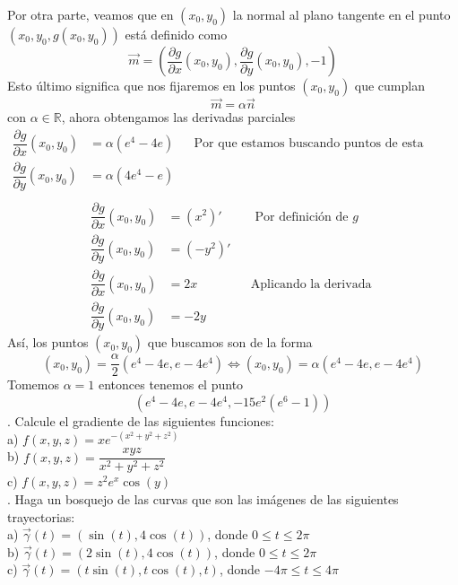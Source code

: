 \documentclass[letterpaper]{article}
\renewcommand{\d}{\partial}
\newcommand{\R}{\mathds{R}}
\renewcommand{\*}{\cdot}
\theoremstyle{definition}
\begin{document}
Por otra parte, veamos que en $ (x_0,y_0) $ la normal al plano tangente en el punto $ (x_0,y_0,g(x_0,y_0)) $ está definido como 
\[ \vec{m} = \left( \dfrac{\d g}{\d x}(x_0, y_0), \dfrac{\d g}{\d y}(x_0,y_0),-1 \right) \]
Esto último significa que nos fijaremos en los puntos $ (x_0,y_0) $ que cumplan \[ \vec{m} = \alpha\vec{n} \] con $ \alpha \in \R $, ahora obtengamos las derivadas parciales 
\begin{align*}
	\dfrac{\d g}{\d x}(x_0, y_0) &= \alpha(e^4-4e) && \text{Por  que estamos buscando puntos de esta forma}\\
	\dfrac{\d g}{\d y}(x_0, y_0) &= \alpha(4e^4-e) && \text{ }\\
\end{align*}
\begin{align*}
	\dfrac{\d g}{\d x}(x_0, y_0) &= (x^2)' && \text{ Por definición de }g\\
	\dfrac{\d g}{\d y}(x_0, y_0) &= (-y^2)' && \text{ }\\
	\dfrac{\d g}{\d x}(x_0, y_0) &= 2x && \text{Aplicando la derivada }\\
	\dfrac{\d g}{\d y}(x_0, y_0) &= -2y && \text{ }
\end{align*}
Así, los puntos $ (x_0,y_0) $ que buscamos son de la forma 
\[ (x_0,y_0) = \dfrac{\alpha}{2}(e^4-4e,e-4e^4) \iff (x_0,y_0) = \alpha(e^4-4e,e-4e^4) \]
Tomemos $ \alpha = 1 $ entonces tenemos el punto
\[ (e^4-4e,e-4e^4, -15e^2(e^6-1) ) \]
.  Calcule el gradiente de las siguientes funciones:\\


\noindent a) $f(x,y,z) = x e^{-(x^2 +y^2 +z^2)}$\\

\noindent b) $f(x,y,z) = \dfrac{xyz}{x^2 +y^2 +z^2}$\\

\noindent c) $f(x,y,z) = z^2e^x\cos(y)$\\



. Haga un bosquejo de las curvas que son las imágenes de las siguientes trayectorias:\\


\noindent a) $\vec{\gamma}(t) = (\sin(t), 4\cos(t))$, donde $0 \leq t \leq 2\pi$\\

\noindent b) $\vec{\gamma}(t) = (2\sin(t), 4\cos(t))$, donde $0 \leq t \leq 2\pi$\\

\noindent c) $\vec{\gamma}(t) = (t\sin(t), t\cos(t), t)$, donde $ -4\pi \leq t \leq 4\pi$\\
\end{document}
